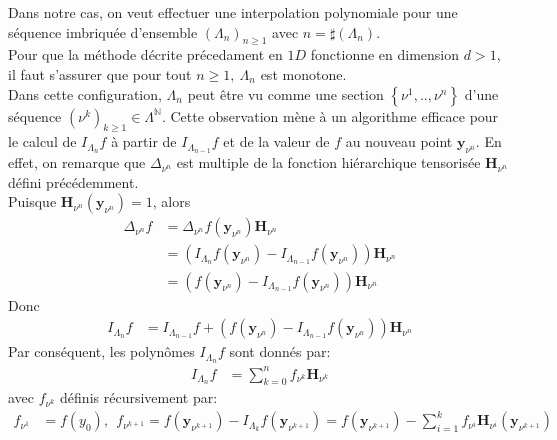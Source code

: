 
\vspace{1cm}
\hspace{0.5cm}
Dans notre cas, on veut effectuer une interpolation polynomiale pour une séquence imbriquée d'ensemble $(\Lambda_n)_{n \geq 1}$ avec $n=\sharp(\Lambda_n)$. \\
Pour que la méthode décrite précedament en $1D$ fonctionne en dimension $d>1$, il faut s'assurer que pour tout $n \geq 1,\ \Lambda_n$ est monotone. \\
Dans cette configuration, $\Lambda_n$ peut être vu comme une section $\left \{ \nu^1, .. , \nu^n \right \}$ d'une séquence $(\nu^k)_{k \geq 1} \in \Lambda^{\mathbb{N}}$. Cette observation mène à un algorithme efficace pour le calcul de $I_{\Lambda_n}f$ à partir de $I_{\Lambda_{n-1}}f$ et de la valeur de $f$ au nouveau point $\textbf{y}_{\nu^n}$. En effet, on remarque que $\Delta_{\nu^n}$ est multiple de la fonction hiérarchique tensorisée $\textbf{H}_{\nu^n}$ défini précédemment.\\
Puisque $\textbf{H}_{\nu^n}(\textbf{y}_{\nu^n}) = 1$, alors \\
\begin{align}
	 \Delta_{\nu^n}f &= \Delta_{\nu^n} f(\textbf{y}_{\nu^n}) \textbf{H}_{\nu^n} \nonumber \\
	 &= (I_{\Lambda_n}f(\textbf{y}_{\nu^n}) - I_{\Lambda_{n-1}}f(\textbf{y}_{\nu^n})) \textbf{H}_{\nu^n}  \nonumber \\
	 &= (f(\textbf{y}_{\nu^n}) - I_{\Lambda_{n-1}}f(\textbf{y}_{\nu^n})) \textbf{H}_{\nu^n} \nonumber
\end{align}
Donc
\begin{align}
	 I_{\Lambda_n}f & = I_{\Lambda_{n-1}}f + (f(\textbf{y}_{\nu^n}) - I_{\Lambda_{n-1}}f(\textbf{y}_{\nu^n})) \textbf{H}_{\nu^n} \nonumber
\end{align}
Par conséquent, les polynômes $I_{\Lambda_n}f$ sont donnés par:
\begin{align}
	 I_{\Lambda_n}f & = \sum_{k=0}^n f_{\nu^k} \textbf{H}_{\nu^k} \nonumber
\end{align}
avec $f_{\nu^k}$ définis récursivement par:
\begin{align}
	 f_{\nu^1} & = f(y_0),\ \ f_{\nu^{k+1}} = f(\textbf{y}_{\nu^{k+1}}) - I_{\Lambda_{k}}f(\textbf{y}_{\nu^{k+1}}) = f(\textbf{y}_{\nu^{k+1}}) - \sum_{i=1}^k f_{\nu^i} \textbf{H}_{\nu^i}(\textbf{y}_{\nu^{k+1}}) \nonumber
\end{align}


